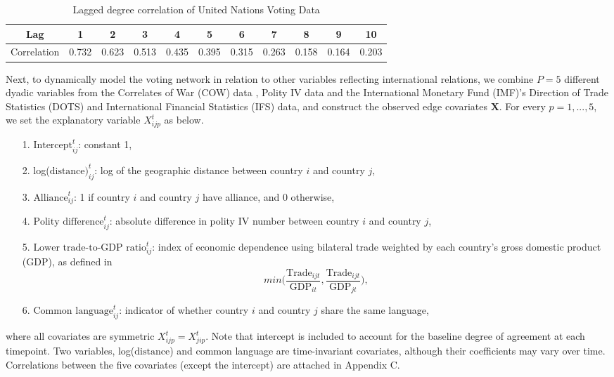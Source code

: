 \documentclass[a4paper]{article}
\begin{document}
\begin{table}[ht]
	\centering
	\begin{tabular}{ |c|c|c|c|c|c|c|c|c|c|c|} 
		\hline
		{Lag}	& 1 & 2& 3& 4& 5& 6& 7&8&9&10 \\ \hline
		Correlation & 0.732&0.623&0.513&0.435&0.395&0.315&0.263&0.158&0.164& 0.203\\\hline
	\end{tabular}
	\caption {Lagged degree correlation of United Nations Voting Data}
	\label{table:corr}
\end{table}
\newline Next, to dynamically model the voting network in relation to other variables reflecting international relations, we combine $P=5$ different dyadic variables from the Correlates of War (COW) data \citep{gibler2008international}, Polity IV data \citep{marshall2014polity} and the International Monetary Fund (IMF)'s Direction of Trade Statistics (DOTS) and International Financial Statistics (IFS) data, and construct the observed edge covariates $\mathbf{X}$. For every $p=1,...,5$, we set the explanatory variable $X^t_{ijp}$ as below.
\begin{itemize}
	\item [1.] $\mbox{Intercept}^t_{ij}$: constant 1,
	\item [2.] log($\mbox{distance})^t_{ij}$: log of the geographic distance between country $i$ and country $j$,
	\item [3.] $\mbox{Alliance}^t_{ij}$: 1 if country $i$ and country $j$ have alliance, and 0 otherwise,
	\item [4.] $\mbox{Polity difference}^t_{ij}$: absolute difference in polity IV number between country $i$ and country $j$,
	\item [5.] $\mbox{Lower trade-to-GDP ratio}^t_{ij}$: index of economic dependence using bilateral trade weighted by each country's gross domestic product (GDP), as defined in \cite{gartzke2000preferences} $$min\Big(\frac{\mbox{Trade}_{ijt}}{\mbox{GDP}_{it}}, \frac{\mbox{Trade}_{ijt}}{\mbox{GDP}_{jt}}\Big),$$
	\item [6.] $\mbox{Common language}^t_{ij}$: indicator of whether country $i$ and country $j$ share the same language,
\end{itemize}
where all covariates are symmetric $X^t_{ijp}=X^t_{jip}$. Note that intercept is included to account for the baseline degree of agreement at each timepoint. Two variables, log($\mbox{distance}$) and common language are time-invariant covariates, although their coefficients may vary over time. Correlations between the five covariates (except the intercept) are attached in Appendix C.\\\newline
\end{document}
